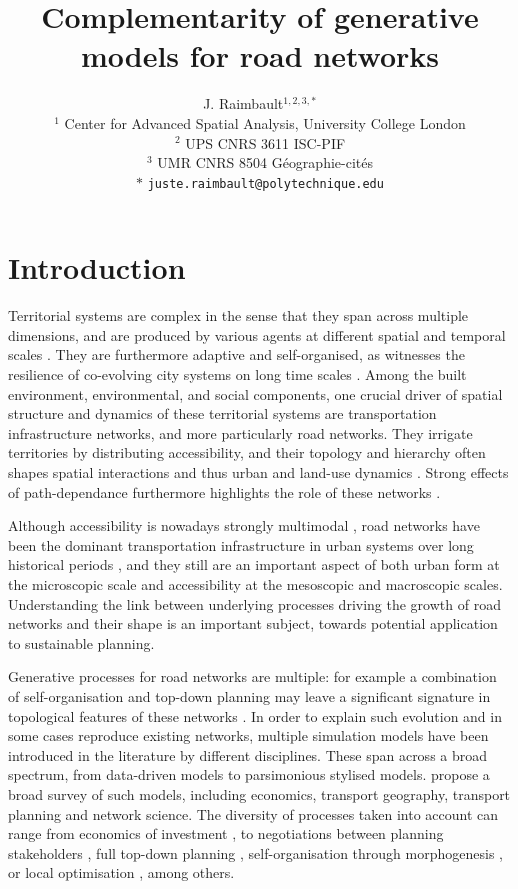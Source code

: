 \documentclass{article}
\title{Complementarity of generative models for road networks}
\author{J. Raimbault$^{1,2,3,\ast}$\\
$^{1}$ Center for Advanced Spatial Analysis, University College London\\
$^{2}$ UPS CNRS 3611 ISC-PIF\\
$^{3}$ UMR CNRS 8504 G{\'e}ographie-cit{\'e}s\medskip\\
$\ast$ \texttt{juste.raimbault@polytechnique.edu}
}
\date{}
\begin{document}
\maketitle


\begin{abstract}
		
\end{abstract}




\section{Introduction}


Territorial systems are complex in the sense that they span across multiple dimensions, and are produced by various agents at different spatial and temporal scales \cite{batty2007complexity}. They are furthermore adaptive and self-organised, as witnesses the resilience of co-evolving city systems on long time scales \cite{pumain2021co}. Among the built environment, environmental, and social components, one crucial driver of spatial structure and dynamics of these territorial systems are transportation infrastructure networks, and more particularly road networks. They irrigate territories by distributing accessibility, and their topology and hierarchy often shapes spatial interactions and thus urban and land-use dynamics \cite{wegener2004land}. Strong effects of path-dependance furthermore highlights the role of these networks \cite{ribeill1985aspects}.

Although accessibility is nowadays strongly multimodal \cite{cats2021multi}, road networks have been the dominant transportation infrastructure in urban systems over long historical periods \cite{verdier2007extension}, and they still are an important aspect of both urban form at the microscopic scale and accessibility at the mesoscopic and macroscopic scales. Understanding the link between underlying processes driving the growth of road networks and their shape is an important subject, towards potential application to sustainable planning.

Generative processes for road networks are multiple: for example a combination of self-organisation and top-down planning may leave a significant signature in topological features of these networks \cite{barthelemy2013self}. In order to explain such evolution and in some cases reproduce existing networks, multiple simulation models have been introduced in the literature by different disciplines. These span across a broad spectrum, from data-driven models to parsimonious stylised models. \cite{xie2009modeling} propose a broad survey of such models, including economics, transport geography, transport planning and network science. The diversity of processes taken into account can range from economics of investment \cite{xie2011evolving}, to negotiations between planning stakeholders \cite{raimbault2021introducing}, full top-down planning \cite{szell2021growing}, self-organisation through morphogenesis \cite{tirico2018morphogenesis}, or local optimisation \cite{barthelemy2009co}, among others.
\end{document}
